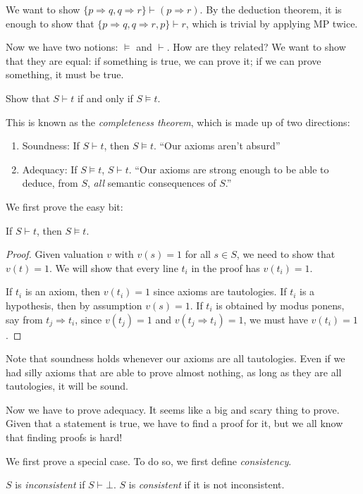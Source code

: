 \documentclass[a4paper]{article}
\begin{document}
\begin{eg}
  We want to show $\{p\Rightarrow q, q\Rightarrow r\} \vdash (p\Rightarrow r)$. By the deduction theorem, it is enough to show that $\{p\Rightarrow q, q\Rightarrow r, p\}\vdash r$, which is trivial by applying MP twice.
\end{eg}

Now we have two notions: $\models$ and $\vdash$. How are they related? We want to show that they are equal: if something is true, we can prove it; if we can prove something, it must be true.

\begin{aim}
 Show that $S\vdash t$ if and only if $S\models t$.
 \end{aim}
This is known as the \emph{completeness theorem}, which is made up of two directions:
\begin{enumerate}
  \item Soundness: If $S\vdash t$, then $S\models t$. ``Our axioms aren't absurd''
  \item Adequacy: If $S\models t$, $S\vdash t$. ``Our axioms are strong enough to be able to deduce, from $S$, \emph{all} semantic consequences of $S$.''
\end{enumerate}

We first prove the easy bit:
\begin{prop}
  If $S\vdash t$, then $S\models t$.
\end{prop}

\begin{proof}
  Given valuation $v$ with $v(s) = 1$ for all $s\in S$, we need to show that $v(t) = 1$. We will show that every line $t_i$ in the proof has $v(t_i) = 1$.

  If $t_i$ is an axiom, then $v(t_i) = 1$ since axioms are tautologies. If $t_i$ is a hypothesis, then by assumption $v(s) = 1$. If $t_i$ is obtained by modus ponens, say from $t_j \Rightarrow t_i$, since $v(t_j) = 1$ and $v(t_j \Rightarrow t_i) = 1$, we must have $v(t_i) = 1$.
\end{proof}
Note that soundness holds whenever our axioms are all tautologies. Even if we had silly axioms that are able to prove almost nothing, as long as they are all tautologies, it will be sound.

Now we have to prove adequacy. It seems like a big and scary thing to prove. Given that a statement is true, we have to find a proof for it, but we all know that finding proofs is hard!

We first prove a special case. To do so, we first define \emph{consistency}.
\begin{defi}[Consistent]
  $S$ is \emph{inconsistent} if $S\vdash \bot$. $S$ is \emph{consistent} if it is not inconsistent.
\end{defi}
\end{document}
